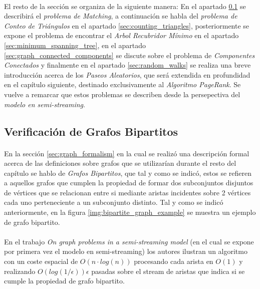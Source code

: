 \documentclass{subfiles}
\begin{document}
      \paragraph{}
      El resto de la sección se organiza de la siguiente manera: En el apartado \ref{sec:bipartite_matchings} se describirá el \emph{problema de Matching}, a continuación se habla del \emph{problema de Conteo de Triángulos} en el apartado \ref{sec:counting_triangles}, posteriormente se expone el problema de encontrar el \emph{Arbol Recubridor Mínimo} en el apartado \ref{sec:minimum_spanning_tree}, en el apartado \ref{sec:graph_connected_components} se discute sobre el problema de \emph{Componentes Conectados} y finalmente en el apartado \ref{sec:random_walks} se realiza una breve introducción acerca de los \emph{Paseos Aleatorios}, que será extendida en profundidad en el capítulo siguiente, destinado exclusivamente al \emph{Algoritmo PageRank}. Se vuelve a remarcar que estos problemas se describen desde la persepectiva del \emph{modelo en semi-streaming}.

      \subsection{Verificación de Grafos Bipartitos}
      \label{sec:bipartite_matchings}

        \paragraph{}
        En la sección \ref{sec:graph_formalism} en la cual se realizó una descripción formal acerca de las definiciones sobre grafos que se utilizarían durante el resto del capítulo se hablo de \emph{Grafos Bipartitos}, que tal y como se indicó, estos se refieren a aquellos grafos que cumplen la propiedad de formar dos subconjuntos disjuntos de vértices que se relacionan entre si mediante aristas incidentes sobre 2 vértices cada uno perteneciente a un subconjunto distinto. Tal y como se indicó anteriormente, en la figura \ref{img:bipartite_graph_example} se muestra un ejemplo de grafo bipartito.

        \paragraph{}
        En el trabajo \emph{On graph problems in a semi-streaming model}\cite{feigenbaum2005graph} (en el cual se expone por primera vez el modelo en semi-streaming) los autores ilustran un algoritmo con un coste espacial de $O(n \cdot log(n))$ procesando cada arista en $O(1)$ y realizando $O(log(1 / \epsilon)) \epsilon$ pasadas sobre el stream de aristas que indica si se cumple la propiedad de grafo bipartito.
\end{document}
